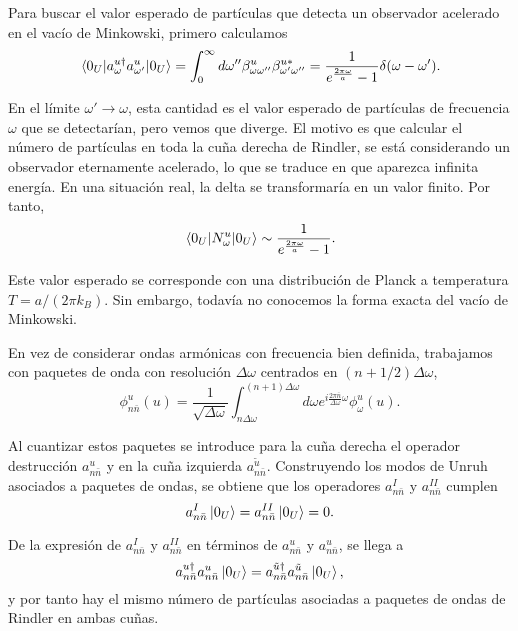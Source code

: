 Para buscar el valor esperado de partículas que detecta un observador acelerado
en el vacío de Minkowski, primero calculamos
\begin{equation}
  \ev{a_\omega^{u\dagger}a_{\omega'}^u}{0_U} = \int_0^\infty d\omega'' \beta_{\omega\omega''}^u
  \beta_{\omega'\omega''}^{u*} = \frac{1}{e^{\frac{2\pi\omega}{a}}-1}\delta(\omega-\omega').
\end{equation}

En el límite $\omega'\to\omega$, esta cantidad es el valor esperado de partículas de frecuencia $\omega$ que se
detectarían, pero vemos que diverge.
El motivo es que calcular el número de partículas en toda la cuña derecha de Rindler, 
se está considerando un observador eternamente acelerado, lo que se traduce en que aparezca infinita
energía.
En una situación real, la delta se transformaría en un valor finito.
Por tanto,
\begin{equation}
  \ev{N_\omega^u}{0_U} \sim \frac{1}{e^{\frac{2\pi\omega}{a}}-1}.
\end{equation}

Este valor esperado se corresponde con una distribución de Planck a temperatura $T=a/(2\pi k_B)$.
Sin embargo, todavía no conocemos la forma exacta del vacío de Minkowski.

En vez de considerar ondas armónicas con frecuencia bien definida, trabajamos con paquetes
de onda con resolución $\Delta \omega$ centrados en $(n+1/2)\Delta \omega$,
\begin{equation}
  \phi_{n\bar n}^u(u)=\frac{1}{\sqrt{\Delta \omega}}\int_{n\Delta\omega}^{(n+1)\Delta \omega}d\omega e^{i\frac{2\pi \bar n}{\Delta \omega}\omega}
  \phi^u_\omega(u).
\end{equation}

Al cuantizar estos paquetes se introduce para la cuña derecha el operador destrucción $a_{n\bar n}^u$
y en la cuña izquierda $a_{n\bar n}^{\tilde u}$. 
Construyendo los modos de Unruh asociados a paquetes de ondas, se obtiene que
los operadores $a_{n\bar n}^I$ y $a_{n\bar n}^{II}$ cumplen
\begin{equation}
  a_{n\bar n}^I\ket{0_U} = a_{n\bar n}^{II} \ket{0_U} = 0.
\end{equation}

De la expresión de $a_{n\bar n}^I$ y $a_{n\bar n}^{II}$ en términos de $a_{n\bar n}^u$ y $a_{n\bar n}^u$, se llega a 
\begin{equation}
  a_{n\bar n}^{u\dagger} a_{n\bar n}^u \ket{0_U} = a_{n\bar n}^{\tilde u\dagger}a_{n\bar n}^{\tilde u} \ket{0_U},
\end{equation}
y por tanto hay el mismo número de partículas asociadas a paquetes de ondas de Rindler en ambas
cuñas.

